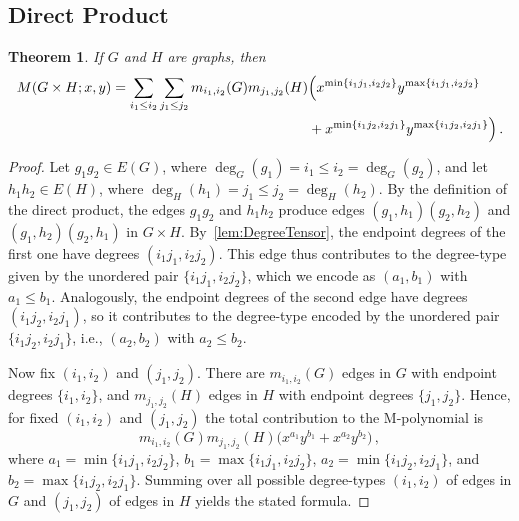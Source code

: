 \documentclass[letterpaper,12pt]{article}
\newtheorem{theorem}{Theorem}[section]
\begin{document}
\subsection{Direct Product} 
\label{sec:Direct}

 \begin{theorem}
\label{thm:tensor-minmax}
If $G$ and $H$ are graphs, then 
\begin{equation}
\begin{aligned}
M(G\times H;x,y)
=\sum_{i_1\le i_2} \sum_{j_1\le j_2}
m_{i_1,i_2}(G) m_{j_1,j_2}(H) 
&\Bigl( x^{\min\{i_1j_1,  i_2j_2\}}y^{\max\{i_1j_1,  i_2j_2\}}
\\&+
x^{\min\{i_1j_2,  i_2j_1\}}y^{\max\{i_1j_2,  i_2j_1\}}
\Bigr)\,.
\end{aligned}
\end{equation}
\end{theorem}
 
\begin{proof}
Let $g_1g_2\in E(G)$, where $\deg_{G}(g_1)=i_{1} \le i_{2} = \deg_{G}(g_2)$, and let $h_1h_2\in E(H)$, where $\deg_{H}(h_1)=j_{1} \le j_2 = \deg_{H}(h_2)$. By the definition of the direct product, the edges $g_1g_2$ and $h_1h_2$ produce edges $(g_1,h_1)(g_2,h_2)$ and $(g_1,h_2)(g_2,h_1)$
in $G\times H$. By~\eqref{lem:DegreeTensor}, the endpoint degrees of the first one have degrees $(i_{1}j_{1},i_{2}j_{2})$. This edge thus contributes to the degree-type given by the unordered pair
$\{i_{1}j_{1},i_{2}j_{2}\}$, which we encode as $(a_{1},b_{1})$ with $a_{1}\le b_{1}$. Analogously,  the endpoint degrees of the second edge have degrees $(i_{1}j_{2},i_{2}j_{1})$, so it contributes to the degree-type encoded by the unordered pair $\{i_{1}j_{2},i_{2}j_{1}\}$, i.e., $(a_{2},b_{2})$ with $a_{2}\le b_{2}$.

Now fix $(i_{1},i_{2})$ and $(j_{1},j_{2})$.  
There are $m_{i_{1},i_{2}}(G)$ edges in $G$ with endpoint degrees $\{i_{1},i_{2}\}$, and
$m_{j_{1},j_{2}}(H)$ edges in $H$ with endpoint degrees $\{j_{1},j_{2}\}$.  Hence, for fixed $(i_{1},i_{2})$ and $(j_{1},j_{2})$ the total contribution to the
M-polynomial is
\[
m_{i_{1},i_{2}}(G) m_{j_{1},j_{2}}(H)
\bigl( x^{a_{1}}y^{b_{1}} + x^{a_{2}}y^{b_{2}} \bigr)\,,
\]
where $a_{1}=\min\{i_1j_1,  i_2j_2\}$, $b_{1}=\max\{i_1j_1,  i_2j_2\}$, $a_2=\min\{i_1j_2,  i_2j_1\}$, and $b_2=\max\{i_1j_2,  i_2j_1\}$. Summing over all possible degree-types $(i_{1},i_{2})$ of edges in $G$ and
$(j_{1},j_{2})$ of edges in $H$ yields the stated formula.
\end{proof}
\end{document}
